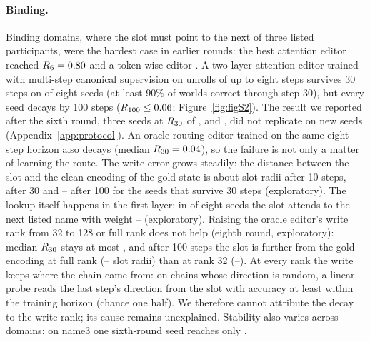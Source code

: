 \paragraph{Binding.}
Binding domains, where the slot must point to the next of three listed participants, were the hardest case in earlier rounds: the best
attention editor reached $R_{6} = 0.80{}$ and a token-wise editor \CLthirteenTokU{}. A two-layer attention editor trained
with multi-step canonical supervision on unrolls of up to eight steps survives 30 steps on \CLthirteenSurvivors{} of eight seeds
(at least 90\% of worlds correct through step 30), but every seed decays by 100 steps ($R_{100} \le 0.06{}$; Figure~\ref{fig:figS2}). The result we
reported after the sixth round, three seeds at $R_{30}$ of \CLthirteenSeedA{}, \CLthirteenSeedB{} and \CLthirteenSeedC{}, did not
replicate on new seeds (Appendix~\ref{app:protocol}). An oracle-routing editor trained on the same eight-step horizon also decays
(median $R_{30} = 0.04{}$), so the failure is not only a matter of learning the route. The write error grows
steadily: the distance between the slot and the clean encoding of the gold state is about \CLthirteenDistTen{} slot radii after 10
steps, \CLthirteenDistThirtyLo{}--\CLthirteenDistThirtyHi{} after 30 and \CLthirteenDistHundredLo{}--\CLthirteenDistHundredHi{} after
100 for the seeds that survive 30 steps (exploratory). The lookup itself happens in the first layer: in \CLthirteenLayerOneCount{} of
eight seeds the slot attends to the next listed name with weight \CLthirteenLayerOneLo{}--\CLthirteenLayerOneHi{} (exploratory). Raising the oracle editor's write rank from 32 to
128 or full rank does not help (eighth round, exploratory): median $R_{30}$ stays at most \CLthirteenEtwoRthirtyMax{}, and after 100
steps the slot is further from the gold encoding at full rank (\CLthirteenEtwoDistFullLo{}--\CLthirteenEtwoDistFullHi{} slot radii)
than at rank 32 (\CLthirteenEtwoDistLo{}--\CLthirteenEtwoDistHi{}). At every rank the write keeps where the chain came from: on chains
whose direction is random, a linear probe reads the last step's direction from the slot with accuracy at least \CLthirteenEtwoDirMin{}
within the training horizon (chance one half). We therefore cannot attribute the decay to the write rank; its cause remains unexplained. Stability also varies across domains: on
name3 one sixth-round seed reaches only \CLthirteenNameSeedB{}.

